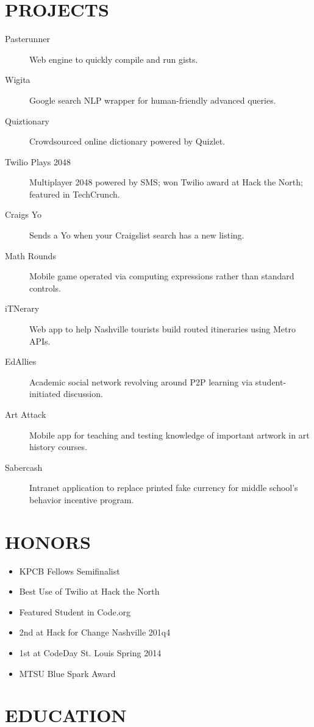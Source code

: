 \documentclass{res}
\begin{document}
\section{PROJECTS}

\begin{description}
  \item[Pasterunner] Web engine to quickly compile and run gists.
  \item[Wigita] Google search NLP wrapper for human-friendly advanced queries.
  \item[Quiztionary] Crowdsourced online dictionary powered by Quizlet.
  \item[Twilio Plays 2048] Multiplayer 2048 powered by SMS; won Twilio award at Hack the North; featured in TechCrunch.
  \item[Craigs Yo] Sends a Yo when your Craigslist search has a new listing.
  \item[Math Rounds] Mobile game operated via computing expressions rather than standard controls.
  \item[iTNerary] Web app to help Nashville tourists build routed itineraries using Metro APIs.
  \item[EdAllies] Academic social network revolving around P2P learning via student-initiated discussion.
  \item[Art Attack] Mobile app for teaching and testing knowledge of important artwork in art history courses.
  \item[Sabercash] Intranet application to replace printed fake currency for middle school's behavior incentive program.
\end{description}

\section{HONORS}

\begin{itemize}
  \item KPCB Fellows Semifinalist
  \item Best Use of Twilio at Hack the North
  \item Featured Student in Code.org
  \item 2nd at Hack for Change Nashville 201q4
  \item 1st at CodeDay St. Louis Spring 2014
  \item MTSU Blue Spark Award
\end{itemize}

\section{EDUCATION}
\end{document}
